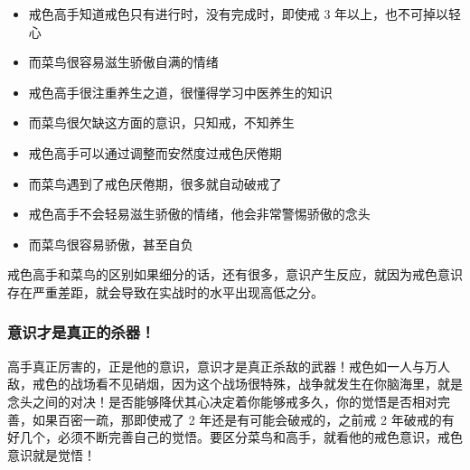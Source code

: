 \begin{paracol}{2}
    \begin{itemize}
        \item 戒色高手知道戒色只有进行时，没有完成时，即使戒 3 年以上，也不可掉以轻心
    \end{itemize}
    \switchcolumn
    \begin{itemize}
        \item 而菜鸟很容易滋生骄傲自满的情绪
    \end{itemize}
    \switchcolumn*

    \begin{itemize}
        \item 戒色高手很注重养生之道，很懂得学习中医养生的知识
    \end{itemize}
    \switchcolumn
    \begin{itemize}
        \item 而菜鸟很欠缺这方面的意识，只知戒，不知养生
    \end{itemize}
    \switchcolumn*

    \begin{itemize}
        \item 戒色高手可以通过调整而安然度过戒色厌倦期
    \end{itemize}
    \switchcolumn
    \begin{itemize}
        \item 而菜鸟遇到了戒色厌倦期，很多就自动破戒了
    \end{itemize}
    \switchcolumn*

    \begin{itemize}
        \item 戒色高手不会轻易滋生骄傲的情绪，他会非常警惕骄傲的念头
    \end{itemize}
    \switchcolumn
    \begin{itemize}
        \item 而菜鸟很容易骄傲，甚至自负
    \end{itemize}
    \switchcolumn*
\end{paracol}

戒色高手和菜鸟的区别如果细分的话，还有很多，意识产生反应，就因为戒色意识存在严重差距，就会导致在实战时的水平出现高低之分。

\subsubsection{意识才是真正的杀器！}

高手真正厉害的，正是他的意识，意识才是真正杀敌的武器！戒色如一人与万人敌，戒色的战场看不见硝烟，因为这个战场很特殊，战争就发生在你脑海里，就是念头之间的对决！是否能够降伏其心决定着你能够戒多久，你的觉悟是否相对完善，如果百密一疏，那即使戒了 2 年还是有可能会破戒的，之前戒 2 年破戒的有好几个，必须不断完善自己的觉悟。要区分菜鸟和高手，就看他的戒色意识，戒色意识就是觉悟！

